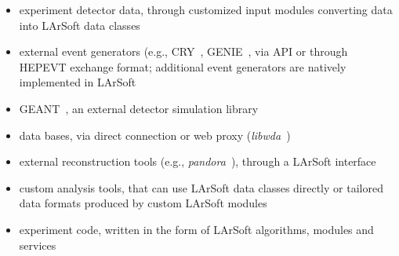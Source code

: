 \begin{itemize}
\item
  experiment detector data, through customized input modules converting
  data into LArSoft data classes
\item
  external event generators (e.g., CRY~\cite{CRY}, GENIE~\cite{GENIE}, via
  API or through HEPEVT exchange format; additional event generators are
  natively implemented in LArSoft
\item
  GEANT~\cite{GEANT}, an external detector simulation library
\item
  data bases, via direct connection or web proxy (\emph{libwda}~\cite{libwda})
\item
  external reconstruction tools (e.g., \emph{pandora}~\cite{pandora}), through a
  LArSoft interface
\item
  custom analysis tools, that can use LArSoft data classes directly or
  tailored data formats produced by custom LArSoft modules
\item
  experiment code, written in the form of LArSoft algorithms, modules
  and services
\end{itemize}

